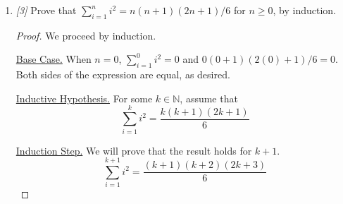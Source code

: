 \documentclass[10pt, letterpaper]{article}
\numberwithin{equation}{section}
\begin{document}
\begin{enumerate}
\begin{proof}
            \underline{Induction Step.} We will prove that the result holds for $k + 1$. That is, we
            will show that
            \begin{equation*}
                \sum_{i = 1}^{k + 1} i = \frac{(k + 1)(k + 2)}{2}
            \end{equation*}

            We begin with the expression on the left, apply the inductive hypothesis to the sum of
            the first $k$ numbers, find a common denominator, and simplify to obtain the expression
            on the right.
            \begin{align*}
                \sum_{i = 1}^{k + 1} i = \sum_{i = 1}^{k} i + (k + 1)
                & = \frac{k(k + 1)}{2} + (k + 1) \\
                & = \frac{k(k + 1)}{2} + \frac{2(k + 1)}{2} \\
                & = \frac{k^2 + k}{2} + \frac{2k + 2}{2} \\
                & = \frac{k^2 + 3k + 2}{2} \\
                & = \frac{(k + 1)(k + 2)}{2}
            \end{align*}

            \underline{Conclusion.} Therefore, by induction, $\sum_{i = 1}^{n} i = n(n + 1) / 2$ for
            $n \geq 0$.
        \end{proof}

        \item \textit{[3]} Prove that $\sum_{i = 1}^{n} i^2 = n(n + 1)(2n + 1) / 6$ for $n \geq 0$,
        by induction.

        \begin{proof}
            We proceed by induction.

            \underline{Base Case.} When $n = 0$, $\sum_{i = 1}^{0} i^2 = 0$ and
            $0(0 + 1)(2(0) + 1) / 6 = 0$. Both sides of the expression are equal, as desired.

            \underline{Inductive Hypothesis.} For some $k \in \mathbb{N}$, assume that
            \begin{equation*}
                \sum_{i = 1}^{k} i^2 = \frac{k(k + 1)(2k + 1)}{6}
            \end{equation*}

            \underline{Induction Step.} We will prove that the result holds for $k + 1$.
            \begin{equation*}
                \sum_{i = 1}^{k + 1} i^2 = \frac{(k + 1)(k + 2)(2k + 3)}{6}
            \end{equation*}


\end{proof}
\end{enumerate}
\end{document}

